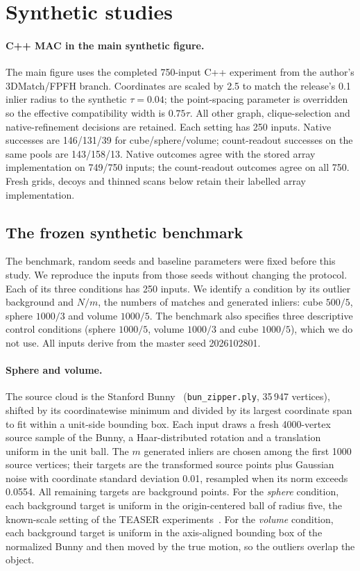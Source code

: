 \section{Synthetic studies}
\label{S-sec:s-synthetic}

\paragraph{C++ MAC in the main synthetic figure.}
The main figure uses the completed 750-input C++ experiment from the author's 3DMatch/FPFH branch. Coordinates are scaled by 2.5 to match the release's 0.1 inlier radius to the synthetic $\tau=0.04$; the point-spacing parameter is overridden so the effective compatibility width is $0.75\tau$. All other graph, clique-selection and native-refinement decisions are retained. Each setting has 250 inputs. Native successes are 146/131/39 for cube/sphere/volume; count-readout successes on the same pools are 143/158/13. Native outcomes agree with the stored array implementation on 749/750 inputs; the count-readout outcomes agree on all 750. Fresh grids, decoys and thinned scans below retain their labelled array implementation.

\subsection{The frozen synthetic benchmark}

The benchmark, random seeds and baseline parameters were fixed before this study. We reproduce the inputs from those seeds without changing the protocol. Each of its three conditions has 250 inputs. We identify a condition by its outlier background and $N/m$, the numbers of matches and generated inliers: cube $500/5$, sphere $1000/3$ and volume $1000/5$. The benchmark also specifies three descriptive control conditions (sphere $1000/5$, volume $1000/3$ and cube $1000/5$), which we do not use. All inputs derive from the master seed 2026102801.

\paragraph{Sphere and volume.} The source cloud is the Stanford Bunny~\cite{stanford} (\texttt{bun\_zipper.ply}, 35\,947 vertices), shifted by its coordinatewise minimum and divided by its largest coordinate span to fit within a unit-side bounding box. Each input draws a fresh 4000-vertex source sample of the Bunny, a Haar-distributed rotation and a translation uniform in the unit ball. The $m$ generated inliers are chosen among the first 1000 source vertices; their targets are the transformed source points plus Gaussian noise with coordinate standard deviation 0.01, resampled when its norm exceeds 0.0554. All remaining targets are background points. For the \emph{sphere} condition, each background target is uniform in the origin-centered ball of radius five, the known-scale setting of the TEASER experiments~\cite{yang2021teaser}. For the \emph{volume} condition, each background target is uniform in the axis-aligned bounding box of the normalized Bunny and then moved by the true motion, so the outliers overlap the object.

